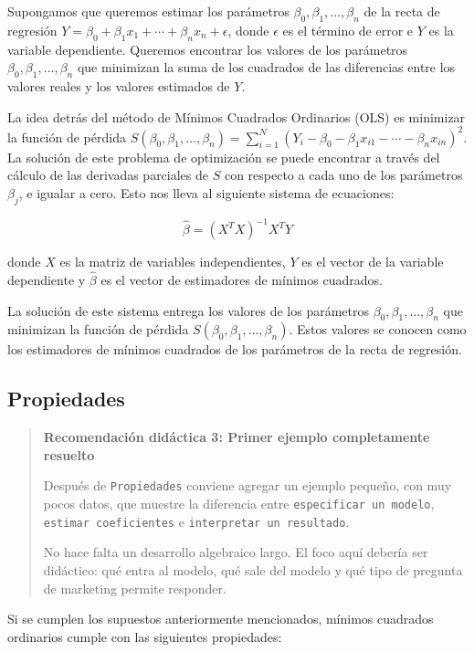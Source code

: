 \documentclass[
]{book}
\begin{document}
Supongamos que queremos estimar los parámetros
\(\beta_0, \beta_1, \ldots, \beta_n\) de la recta de regresión
\(Y = \beta_0 + \beta_1 x_1 + \cdots + \beta_n x_n + \epsilon\), donde
\(\epsilon\) es el término de error e \(Y\) es la variable dependiente.
Queremos encontrar los valores de los parámetros
\(\beta_0, \beta_1, \ldots, \beta_n\) que minimizan la suma de los
cuadrados de las diferencias entre los valores reales y los valores
estimados de \(Y\).

La idea detrás del método de Mínimos Cuadrados Ordinarios (OLS) es
minimizar la función de pérdida
\(S(\beta_0, \beta_1, \ldots, \beta_n) = \sum_{i=1}^N (Y_i - \beta_0 - \beta_1 x_{i1} - \cdots - \beta_n x_{in})^2\).
La solución de este problema de optimización se puede encontrar a través
del cálculo de las derivadas parciales de \(S\) con respecto a cada uno de
los parámetros \(\beta_j\), e igualar a cero. Esto nos lleva al siguiente
sistema de ecuaciones:

\[\hat{\beta}=(X^TX)^{-1}X^TY\]

donde \(X\) es la matriz de variables independientes, \(Y\) es el vector de
la variable dependiente y \(\hat{\beta}\) es el vector de estimadores de
mínimos cuadrados.

La solución de este sistema entrega los valores de los parámetros
\(\beta_0, \beta_1, \ldots, \beta_n\) que minimizan la función de pérdida
\(S(\beta_0, \beta_1, \ldots, \beta_n)\). Estos valores se conocen como
los estimadores de mínimos cuadrados de los parámetros de la recta de
regresión.

\subsection{Propiedades}\label{propiedades-1}

\begin{quote}
\textbf{Recomendación didáctica 3: Primer ejemplo completamente resuelto}

Después de \texttt{Propiedades} conviene agregar un ejemplo pequeño, con muy
pocos datos, que muestre la diferencia entre \texttt{especificar\ un\ modelo},
\texttt{estimar\ coeficientes} e \texttt{interpretar\ un\ resultado}.

No hace falta un desarrollo algebraico largo. El foco aquí debería ser
didáctico: qué entra al modelo, qué sale del modelo y qué tipo de
pregunta de marketing permite responder.
\end{quote}

Si se cumplen los supuestos anteriormente mencionados, mínimos cuadrados
ordinarios cumple con las siguientes propiedades:
\end{document}

